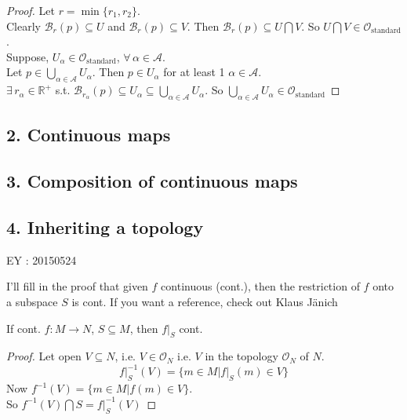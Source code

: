\documentclass[10pt, twoside]{amsart}
\begin{document}
\begin{multicols*}{2}
\begin{proof}
Let $r=\min{ \lbrace r_1, r_2 \rbrace}$.   \\
Clearly $\mathcal{B}_r(p) \subseteq U$ and $\mathcal{B}_r(p) \subseteq V$.  Then $\mathcal{B}_r(p) \subseteq U \bigcap V$.  So $U\bigcap V \in \mathcal{O}_{\text{standard}}$.   \\

Suppose, $U_{\alpha} \in \mathcal{O}_{\text{standard}}$, $\forall \, \alpha \in \mathcal{A}$.  \\
Let $p \in \bigcup_{\alpha \in \mathcal{A}} U_{\alpha}$.  Then $p \in U_{\alpha}$ for at least 1 $\alpha \in \mathcal{A}$.  \\
\phantom{ \quad \, } $\exists \, r_{\alpha} \in \mathbb{R}^+$ s.t. $\mathcal{B}_{r_{\alpha}}(p) \subseteq U_{\alpha} \subseteq \bigcup_{\alpha \in \mathcal{A}} U_{\alpha}$.  So $\bigcup_{\alpha \in \mathcal{A}} U_{\alpha} \in \mathcal{O}_{\text{standard}}$  
\end{proof}


\subsection{2. Continuous maps}

\subsection{3. Composition of continuous maps}

\subsection{4. Inheriting a topology}


EY : 20150524

I'll fill in the proof that given $f$ continuous (cont.), then the restriction of $f$ onto a subspace $S$ is cont.  If you want a reference, check out Klaus J\"{a}nich \cite[pp. 13, Ch. 1 Fundamental Concepts, Sec. Continuous Maps]{KJanich1995}

If cont. $f: M \to N$, $S \subseteq M$, then $\left. f \right|_S$ cont.  

\begin{proof}
  Let open $V \subseteq N$, i.e. $V \in \mathcal{O}_N$ i.e. $V$ in the topology $\mathcal{O}_N$ of $N$.  
\[
\left. f\right|_S^{-1}(V) = \lbrace m \in M | \left. f \right|_S(m) \in V \rbrace
\]
Now $f^{-1}(V) = \lbrace m \in M | f(m) \in V \rbrace$. \\
So $f^{-1}(V) \bigcap S = \left. f \right|_S^{-1}(V)$


\end{proof}
\end{multicols*}
\end{document}
